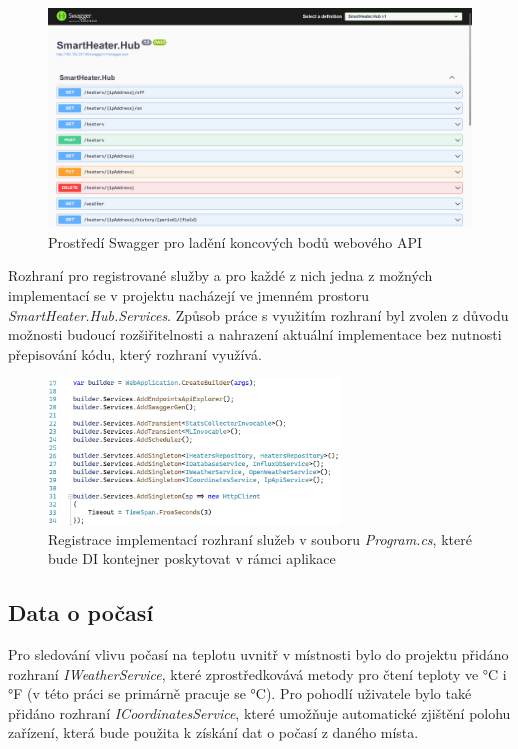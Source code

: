 \begin{figure}[hbt]
\includegraphics[width=\textwidth]{obrazky-figures/swagger.png}
\caption{Prostředí Swagger pro ladění koncových bodů webového API}
\end{figure}

Rozhraní pro registrované služby a pro každé z nich jedna z možných implementací se v projektu nacházejí ve jmenném prostoru {\it SmartHeater.Hub.Services}. Způsob práce s využitím rozhraní byl zvolen z důvodu možnosti budoucí rozšiřitelnosti a nahrazení aktuální implementace bez nutnosti přepisování kódu, který rozhraní využívá.

\begin{figure}[hbt]
\centering
\includegraphics[width=0.69\textwidth]{obrazky-figures/code-hubservices.png}
\caption{Registrace implementací rozhraní služeb v souboru {\it Program.cs}, které bude DI kontejner poskytovat v rámci aplikace}
\end{figure}

\subsection{Data o počasí}
Pro sledování vlivu počasí na teplotu uvnitř v místnosti bylo do projektu přidáno rozhraní {\it IWeatherService}, které zprostředkovává metody pro čtení teploty ve °C i °F (v této práci se primárně pracuje se °C). Pro pohodlí uživatele bylo také přidáno rozhraní {\it ICoordinatesService}, které umožňuje automatické zjištění polohu zařízení, která bude použita k získání dat o počasí z daného místa.

